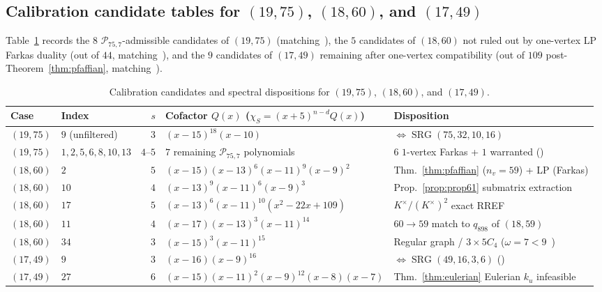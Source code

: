 \documentclass[11pt,reqno]{amsart}
\theoremstyle{definition}
\theoremstyle{remark}
\numberwithin{equation}{section}
\numberwithin{table}{section}
\DeclareMathOperator{\SRG}{SRG}
\begin{document}
\subsection{Calibration candidate tables for \texorpdfstring{$(19, 75)$, $(18, 60)$, and $(17, 49)$}{(19, 75), (18, 60), and (17, 49)}}
Table~\ref{tab:cal_benchmarks} records the $8$ $\mathcal{P}_{75,7}$-admissible candidates of $(19, 75)$ (matching~\cite[Prop.~3.3]{GSY2021}), the $5$ candidates of $(18, 60)$ not ruled out by one-vertex LP Farkas duality (out of $44$, matching~\cite{GS2024}), and the $9$ candidates of $(17, 49)$ remaining after one-vertex compatibility (out of $109$ post-Theorem~\ref{thm:pfaffian}, matching~\cite{GSY2023}).

\begin{table}[htbp]
\centering
\caption{Calibration candidates and spectral dispositions for $(19, 75)$, $(18, 60)$, and $(17, 49)$.}\label{tab:cal_benchmarks}
\scriptsize
\setlength{\tabcolsep}{3.5pt}
\begin{tabular}{@{}llr>{\raggedright\arraybackslash}p{2.40in}>{\raggedright\arraybackslash}p{1.90in}@{}}
\toprule
Case & Index & $s$ & Cofactor $Q(x)$ ($\chi_S = (x+5)^{n-d}Q(x)$) & Disposition \\
\midrule
$(19,75)$ & $9$ (unfiltered) & $3$ & $(x-15)^{18}(x-10)$ & $\Leftrightarrow \SRG(75,32,10,16)$~\cite{GSY2021,AzarijaMarc2018} \\
$(19,75)$ & $1,2,5,6,8,10,13$ & $4$--$5$ & $7$ remaining $\mathcal{P}_{75,7}$ polynomials & $6$ $1$-vertex Farkas + $1$ warranted (\cite{GSY2021}) \\
\midrule
$(18,60)$ & $2$ & $5$ & $(x-15)(x-13)^6(x-11)^9(x-9)^2$ & Thm.~\ref{thm:pfaffian} ($n_v=59$) + LP (Farkas) \\
$(18,60)$ & $10$ & $4$ & $(x-13)^9(x-11)^6(x-9)^3$ & Prop.~\ref{prop:prop61} submatrix extraction \\
$(18,60)$ & $17$ & $5$ & $(x-13)^6(x-11)^{10}(x^2-22x+109)$ & $K^\times/(K^\times)^2$ exact RREF \\
$(18,60)$ & $11$ & $4$ & $(x-17)(x-13)^3(x-11)^{14}$ & $60\to 59$ match to $q_{898}$ of $(18,59)$ \\
$(18,60)$ & $34$ & $3$ & $(x-15)^3(x-11)^{15}$ & Regular graph / $3\times 5C_4$ ($\omega = 7 < 9$~\cite{GS2024}) \\
\midrule
$(17,49)$ & $9$ & $3$ & $(x-16)(x-9)^{16}$ & $\Leftrightarrow \SRG(49,16,3,6)$ (\cite{BHMW1989,GSY2023}) \\
$(17,49)$ & $27$ & $6$ & $(x-15)(x-11)^2(x-9)^{12}(x-8)(x-7)$ & Thm.~\ref{thm:eulerian} Eulerian $k_u$ infeasible \\

\end{tabular}
\end{table}
\end{document}
